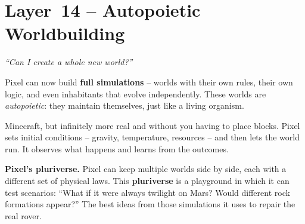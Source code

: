 \section{Layer~14 – Autopoietic Worldbuilding}
\label{sec:layer14}

\begin{tcolorbox}[colback=blue!5, colframe=blue!60, title=\textbf{Superpower: The World‑Builder}]
\begin{center}
\textit{“Can I create a whole new world?”}
\end{center}
\end{tcolorbox}

Pixel can now build \textbf{full simulations} – worlds with their own
rules, their own logic, and even inhabitants that evolve independently.
These worlds are \emph{autopoietic}: they maintain themselves, just
like a living organism.

\begin{tcolorbox}[colback=yellow!5, colframe=yellow!80, title=Real‑life analogy]
Minecraft, but infinitely more real and without you having to place
blocks.  Pixel sets initial conditions – gravity, temperature,
resources – and then lets the world run.  It observes what happens
and learns from the outcomes.
\end{tcolorbox}

\textbf{Pixel’s pluriverse.}
Pixel can keep multiple worlds side by side, each with a different
set of physical laws.  This \textbf{pluriverse} is a playground in
which it can test scenarios: “What if it were always twilight on Mars?
Would different rock formations appear?”  The best ideas from those
simulations it uses to repair the real rover.